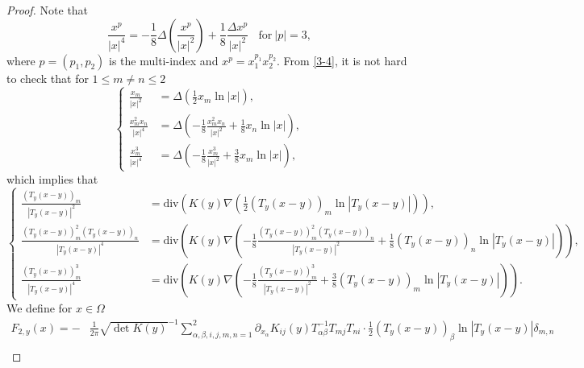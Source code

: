 \documentclass[12pt,reqno]{amsart}
\numberwithin{equation}{section}
\theoremstyle{definition}
\theoremstyle{remark}
\begin{document}
\begin{proof}
	
	Note that
	\begin{equation}\label{3-4}
	\frac{x^p}{|x|^4}=-\frac{1}{8}\Delta\left( \frac{x^p}{|x|^2}\right)+\frac{1}{8}\frac{\Delta x^p}{|x|^2}\ \ \ \ \text{for}\ |p|=3,
	\end{equation}
	where $p=(p_1,p_2)$ is the multi-index and $ x^p=x_1^{p_1}x_2^{p_2} $. From \eqref{3-4}, it is not hard to check that for $ 1\leq m\neq n\leq 2 $
	\begin{equation*}
	\begin{cases}
	\frac{x_m}{|x|^2}&=\Delta\left( \frac{1}{2}x_m\ln|x|\right),\\
	\frac{x_m^2x_n}{|x|^4}&=\Delta\left( -\frac{1}{8}\frac{x_m^2x_n}{|x|^2}+\frac{1}{8}x_n\ln|x|\right),\\
	\frac{x_m^3}{|x|^4}&=\Delta\left( -\frac{1}{8}\frac{x_m^3}{|x|^2}+\frac{3}{8}x_m\ln|x|\right),
	\end{cases}
	\end{equation*}
	which implies that
	\begin{equation}\label{3-5}
	\begin{cases}
	\frac{\left (T_y\left (x-y\right )\right )_m}{|T_y\left (x-y\right )|^2}&=\text{div}\left(K(y) \nabla\left( \frac{1}{2}\left (T_y\left (x-y\right )\right )_m\ln|T_y\left (x-y\right )|\right)\right) ,\\
	\frac{\left (T_y\left (x-y\right )\right )_m^2\left (T_y\left (x-y\right )\right )_n}{|T_y\left (x-y\right )|^4}&=\text{div}\left(K(y) \nabla \left( -\frac{1}{8}\frac{\left (T_y\left (x-y\right )\right )_m^2\left (T_y\left (x-y\right )\right )_n}{|T_y\left (x-y\right )|^2}+\frac{1}{8}\left (T_y\left (x-y\right )\right )_n\ln|T_y\left (x-y\right )|\right)\right) ,\\
	\frac{\left (T_y\left (x-y\right )\right )_m^3}{|T_y\left (x-y\right )|^4}&=\text{div}\left(K(y) \nabla\left( -\frac{1}{8}\frac{\left (T_y\left (x-y\right )\right )_m^3}{|T_y\left (x-y\right )|^2}+\frac{3}{8}\left (T_y\left (x-y\right )\right )_m\ln|T_y\left (x-y\right )|\right)\right).
	\end{cases}
	\end{equation}
	We define for $ x\in \Omega $
	\begin{equation*}
	\begin{split}
	F_{2,y}(x)=-&\frac{1}{2\pi}\sqrt{\det K(y)}^{-1}\sum_{\alpha,\beta,i,j,m,n=1}^2 \partial_{x_\alpha}K_{ij}(y)T^{-1}_{\alpha\beta} T_{mj}T_{ni}\cdot\frac{1}{2}\left (T_y\left (x-y\right )\right )_\beta\ln|T_y\left (x-y\right )|\delta_{m,n}\\

\end{split}
\end{equation*}
\end{proof}
\end{document}
